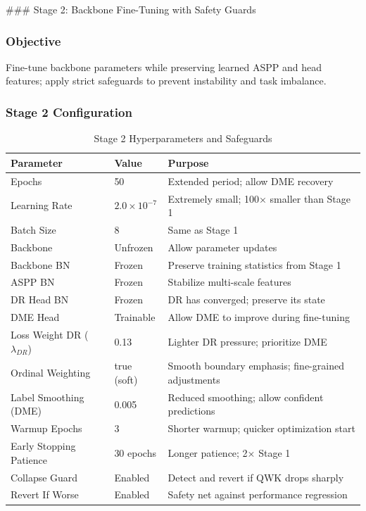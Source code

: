 \documentclass[12pt,a4paper]{article}
\begin{document}
### Stage 2: Backbone Fine-Tuning with Safety Guards

\subsubsection{Objective}

Fine-tune backbone parameters while preserving learned ASPP and head features; apply strict safeguards to prevent instability and task imbalance.

\subsubsection{Stage 2 Configuration}

\begin{table}[H]
\centering
\small
\caption{Stage 2 Hyperparameters and Safeguards}
\begin{tabular}{|l|l|p{3cm}|}
\hline
\textbf{Parameter} & \textbf{Value} & \textbf{Purpose} \\
\hline
Epochs & 50 & Extended period; allow DME recovery \\
Learning Rate & $2.0 \times 10^{-7}$ & Extremely small; 100× smaller than Stage 1 \\
Batch Size & 8 & Same as Stage 1 \\
Backbone & Unfrozen & Allow parameter updates \\
Backbone BN & Frozen & Preserve training statistics from Stage 1 \\
ASPP BN & Frozen & Stabilize multi-scale features \\
DR Head BN & Frozen & DR has converged; preserve its state \\
DME Head & Trainable & Allow DME to improve during fine-tuning \\
\hline
Loss Weight DR ($\lambda_{DR}$) & 0.13 & Lighter DR pressure; prioritize DME \\
Ordinal Weighting & true (soft) & Smooth boundary emphasis; fine-grained adjustments \\
Label Smoothing (DME) & 0.005 & Reduced smoothing; allow confident predictions \\
Warmup Epochs & 3 & Shorter warmup; quicker optimization start \\
Early Stopping Patience & 30 epochs & Longer patience; 2× Stage 1 \\
\hline
Collapse Guard & Enabled & Detect and revert if QWK drops sharply \\
Revert If Worse & Enabled & Safety net against performance regression \\
\hline
\end{tabular}
\end{table}
\end{document}
